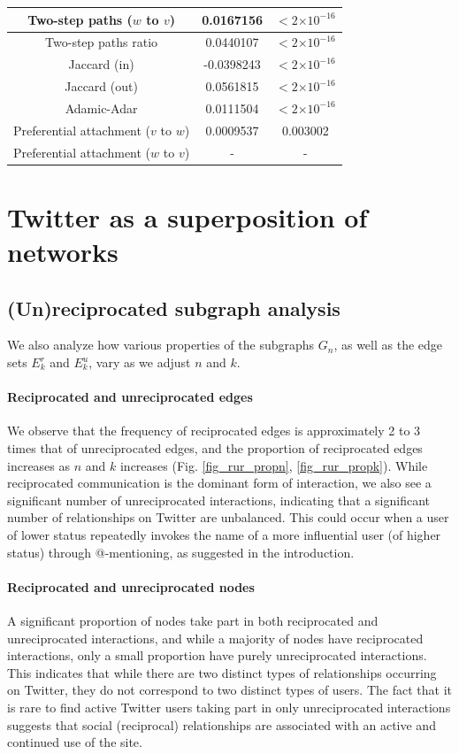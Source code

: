 \documentclass[conference]{IEEEtran}
\providecommand{\e}[1]{\ensuremath{\times 10^{#1}}}
\begin{document}
\begin{table}[!t]
\begin{tabular}{|c||c|c|}
Two-step paths ($w$ to $v$)   &    0.0167156  & $< 2 \e{-16} $\\
\hline
Two-step paths ratio &   0.0440107 & $< 2 \e{-16} $\\
Jaccard (in) & -0.0398243 & $< 2 \e{-16} $\\
Jaccard (out) &   0.0561815  & $< 2 \e{-16} $\\
Adamic-Adar  & 0.0111504 & $< 2 \e{-16} $ \\
Preferential attachment ($v$ to $w$) & 0.0009537 & 0.003002 \\
Preferential attachment ($w$ to $v$)  &  - & -  \\
\hline
\end{tabular}
\end{table}

\section{Twitter as a superposition of networks}

\subsection{(Un)reciprocated subgraph analysis}
We also analyze how various properties of the subgraphs $G_n$, as well as the edge sets $E^r_k$ and $E^u_k$, vary as we adjust $n$ and $k$.

\paragraph*{Reciprocated and unreciprocated edges} We observe that the frequency of reciprocated edges is approximately 2 to 3 times that of unreciprocated edges, and the proportion of reciprocated edges increases as $n$ and $k$ increases (Fig. \ref{fig_rur_propn}, \ref{fig_rur_propk}). 
While reciprocated communication is the dominant form of interaction,
we also see a significant number of unreciprocated interactions,
indicating that a significant number of relationships on Twitter are
unbalanced.  This could occur when a user of lower status repeatedly
invokes the name of a more influential user (of higher status) through
@-mentioning, as suggested in the introduction.

\paragraph*{Reciprocated and unreciprocated nodes}
A significant proportion of nodes take part in both reciprocated and unreciprocated interactions,
and while a majority of nodes have reciprocated interactions, only a small proportion have purely unreciprocated interactions.
This indicates that while there are two distinct types of relationships occurring on Twitter, they do not correspond to two distinct types of users. 
The fact that it is rare to find 
active Twitter users taking part in only unreciprocated interactions
suggests that 
social (reciprocal) relationships are associated with
an active and continued use of the site.
\end{document}
